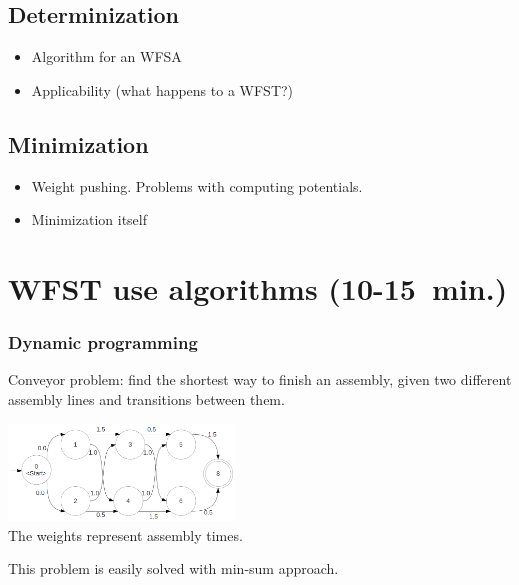 \documentclass{beamer}
\newcommand{\<}{\langle}
\renewcommand{\>}{\rangle}
\begin{document}
\subsection{Determinization}
\begin{frame}
  \begin{itemize}
  \item Algorithm for an WFSA
  \item Applicability (what happens to a WFST?)
  \end{itemize}
\end{frame}

\subsection{Minimization}

\begin{frame}
  \begin{itemize}
  \item Weight pushing. Problems with computing potentials.
  \item Minimization itself
  \end{itemize}
\end{frame}






\section{WFST use algorithms (10-15~min.)}

\begin{frame}
  \frametitle{Dynamic programming}
  Conveyor problem: find the shortest way to finish an assembly, given two different assembly lines and transitions between them. 
  \begin{center}
\includegraphics[width=6cm]{fsa-weights-2.png}\\
The weights represent assembly times.
\end{center}
This problem is easily solved with min-sum approach.
\end{frame}
\end{document}
